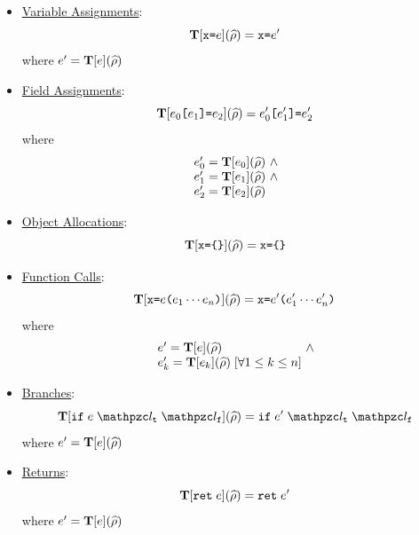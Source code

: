 \documentclass[10pt,conference]{IEEEtran}
\begin{document}
\begin{itemize}
  \item \underline{Variable Assignments}:
    \[
      \transform{\varx \kweq \expr}(\aenv) =
      \varx \kweq \expr'
    \]
    where $e' = \textbf{T}[e](\widehat{\rho})$

  \item \underline{Field Assignments}:
    \[
      \transform{\expr_0 \kwsl \expr_1 \kwsr \kweq \expr_2}(\aenv) =
      \expr'_0 \kwsl \expr'_1 \kwsr \kweq \expr'_2
    \]
    where
    \[
      \begin{array}{l@{~}c@{~}ll}
        \expr'_0 = \transform{\expr_0}(\aenv) &\wedge\\
        \expr'_1 = \transform{\expr_1}(\aenv) &\wedge\\
        \expr'_2 = \transform{\expr_2}(\aenv)\\
      \end{array}
    \]
  \item \underline{Object Allocations}:
    \[
      \transform{\varx \kweq \kwcl \kwcr}(\aenv) =
      \varx \kweq \kwcl \kwcr
    \]

  \item \underline{Function Calls}:
    \[
      \transform{\varx \kweq \expr \kwrl \expr_1 \cdots \expr_n \kwrr}(\aenv) =
      \varx \kweq \expr' \kwrl \expr'_1 \cdots \expr'_n \kwrr
    \]
    where
    \[
      \begin{array}{l@{~}c@{~}ll}
        \expr' = \transform{\expr}(\aenv) &\wedge\\
        \expr'_k = \transform{\expr_k}(\aenv) \; [\forall 1 \leq k \leq
        n]\\
      \end{array}
    \]

  \item \underline{Branches}:
    \[
      \transform{\kwif \; \expr \; \lab_\vart \; \lab_\varf}(\aenv) =
      \kwif \; \expr' \; \lab_\vart \; \lab_\varf
    \]
    where $e' = \textbf{T}[e](\widehat{\rho})$

  \item \underline{Returns}:
    \[
      \transform{\kwret \; \expr}(\aenv) =
      \kwret \; \expr'
    \]
    where $e' = \textbf{T}[e](\widehat{\rho})$
\end{itemize}
\end{document}
